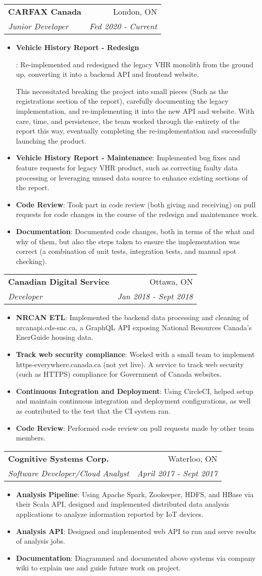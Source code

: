 \documentclass[letterpaper,11pt]{article}
\makeatletter
\newcommand{\resumeItem}[2]{
  \item\small{
    \textbf{#1}{: #2 \vspace{-2pt}}
  }
}
\newcommand{\resumeSubheading}[4]{
  \vspace{-1pt}\item
    \begin{tabular*}{0.97\textwidth}{l@{\extracolsep{\fill}}r}
      \textbf{#1} & #2 \\
      \textit{\small#3} & \textit{\small #4} \\
    \end{tabular*}\vspace{-5pt}
}
\newcommand{\resumeItemListStart}{\begin{itemize}}
\newcommand{\resumeItemListEnd}{\end{itemize}\vspace{-5pt}}
\makeatother
\begin{document}
    \resumeSubheading
      {CARFAX Canada}{London, ON}
      {Junior Developer}{Fed 2020 - Current}
      \resumeItemListStart
        \resumeItem{Vehicle History Report - Redesign}
          {Re-implemented and redesigned the legacy VHR monolith from the ground up, converting it into a backend API and frontend website.

          This necessitated breaking the project into small pieces (Such as the registrations section of the report), carefully documenting the legacy implementation, and re-implementing it into the new API and website. With care, time, and persistence, the team worked through the entirety of the report this way, eventually completing the re-implementation and successfully launching the product.}
        \resumeItem{Vehicle History Report - Maintenance}
          {Implemented bug fixes and feature requests for legacy VHR product, such as correcting faulty data processing or leveraging unused data source to enhance existing sections of the report.}
        \resumeItem{Code Review}
          {Took part in code review (both giving and receiving) on pull requests for code changes in the course of the redesign and maintenance work.}
        \resumeItem{Documentation}
          {Documented code changes, both in terms of the what and why of them, but also the steps taken to ensure the implementation was correct (a combination of unit tests, integration tests, and manual spot checking).}
      \resumeItemListEnd

    \resumeSubheading
      {Canadian Digital Service}{Ottawa, ON}
      {Developer}{Jan 2018 - Sept 2018}
      \resumeItemListStart
        \resumeItem{NRCAN ETL}
          {Implemented the backend data processing and cleaning of nrcanapi.cds-snc.ca, a GraphQL API exposing National Resources Canada's EnerGuide housing data.}
        \resumeItem{Track web security compliance}
          {Worked with a small team to implement https-everywhere.canada.ca (not yet live). A service to track web security (such as HTTPS) compliance for Government of Canada websites.}
        \resumeItem{Continuous Integration and Deployment}
          {Using CircleCI, helped setup and maintain continuous integration and deployment configurations, as well as contributed to the test that the CI system ran.}
        \resumeItem{Code Review}
          {Performed code review on pull requests made by other team members.}
      \resumeItemListEnd

    \resumeSubheading
      {Cognitive Systems Corp.}{Waterloo, ON}
      {Software Developer/Cloud Analyst}{April 2017 - Sept 2017}
      \resumeItemListStart
        \resumeItem{Analysis Pipeline}
          {Using Apache Spark, Zookeeper, HDFS, and HBase via their Scala API, designed and implemented distributed data analysis applications to analyze information reported by IoT devices.}
        \resumeItem{Analysis API}
          {Designed and implemented web API to run and serve results of analysis jobs.}
        \resumeItem{Documentation}
          {Diagrammed and documented above systems via company wiki to explain use and guide future work on project.}
      \resumeItemListEnd
\end{document}
